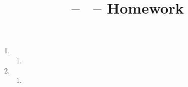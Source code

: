 \documentclass[11pt]{article}
\title{\CourseName -- \CourseSemester\ \CourseYear -- Homework \HWnum}
\author{\Name}
\begin{document}
\maketitle

\begin{enumerate}

\item
\begin{enumerate}
\item
\end{enumerate} %

\item
\begin{enumerate}
\item
\end{enumerate} %

\end{enumerate} %
\end{document}
